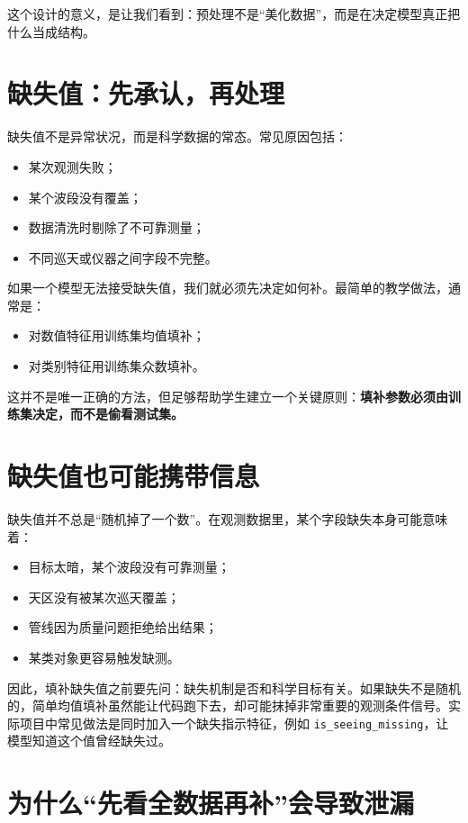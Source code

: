这个设计的意义，是让我们看到：预处理不是“美化数据”，而是在决定模型真正把什么当成结构。

\section{缺失值：先承认，再处理}

缺失值不是异常状况，而是科学数据的常态。常见原因包括：

\begin{itemize}
    \item 某次观测失败；
    \item 某个波段没有覆盖；
    \item 数据清洗时剔除了不可靠测量；
    \item 不同巡天或仪器之间字段不完整。
\end{itemize}

如果一个模型无法接受缺失值，我们就必须先决定如何补。最简单的教学做法，通常是：

\begin{itemize}
    \item 对数值特征用训练集均值填补；
    \item 对类别特征用训练集众数填补。
\end{itemize}

这并不是唯一正确的方法，但足够帮助学生建立一个关键原则：\textbf{填补参数必须由训练集决定，而不是偷看测试集。}

\section{缺失值也可能携带信息}

缺失值并不总是“随机掉了一个数”。在观测数据里，某个字段缺失本身可能意味着：

\begin{itemize}
    \item 目标太暗，某个波段没有可靠测量；
    \item 天区没有被某次巡天覆盖；
    \item 管线因为质量问题拒绝给出结果；
    \item 某类对象更容易触发缺测。
\end{itemize}

因此，填补缺失值之前要先问：缺失机制是否和科学目标有关。如果缺失不是随机的，简单均值填补虽然能让代码跑下去，却可能抹掉非常重要的观测条件信号。实际项目中常见做法是同时加入一个缺失指示特征，例如 \texttt{is\_seeing\_missing}，让模型知道这个值曾经缺失过。

\section{为什么“先看全数据再补”会导致泄漏}

